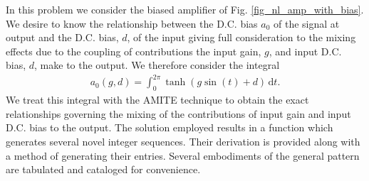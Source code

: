 In this problem we consider the biased amplifier of Fig. \ref{fig_nl_amp_with_bias}.
We desire to know the relationship between the D.C. bias $a_0$ of the signal at output
and the D.C. bias, $d$, of the input giving full consideration to the mixing effects
due to the coupling of contributions the input gain, $g$, and input D.C. bias, $d$,
make to the output.  We therefore consider the integral
\begin{align}
	a_0(g, d) = \int_{0}^{2 \pi} \! \tanh(g \sin(t) + d) \, \mathrm{d}t.
\end{align}
We treat this integral with the AMITE technique to obtain the exact relationships
governing the mixing of the contributions of input gain and input D.C. bias to the
output.  The solution employed results in a function which generates several
novel integer sequences.  Their derivation is provided along with a method of
generating their entries.  Several embodiments of the general pattern are
tabulated and cataloged for convenience.

